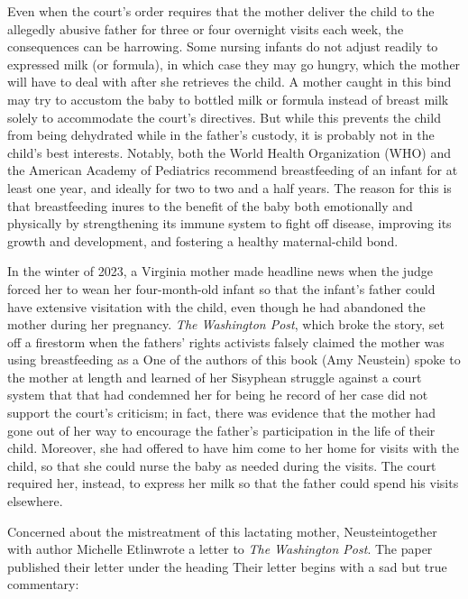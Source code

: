 Even when the court’s order requires  that the mother deliver
the child to the allegedly abusive father for three or four overnight visits
each week, the consequences can be harrowing. Some nursing infants do
not adjust readily to expressed milk (or formula), in which case they may
go hungry, which the mother will have to deal with after she retrieves
the child. A mother caught in this bind may try to accustom the baby
to bottled milk or formula instead of breast milk solely to accommodate
the court’s directives. But while this prevents the child from being 
dehydrated while in the father's custody, it is probably not in the child's best
interests. Notably, both the World Health Organization (WHO) and the
American Academy of Pediatrics recommend breastfeeding of an infant
for at least one year, and ideally for two to two and a half years. 
The reason for this is that breastfeeding inures to the benefit of the baby both emotionally and physically
by strengthening its immune system to fight off disease, improving its
growth and development, and fostering a healthy maternal-child bond. \pfl{}

In the winter of 2023, a Virginia mother made headline news when
the judge forced her to wean her four-month-old infant so that the infant's father could have extensive visitation with the child, even though
he had abandoned the mother during her pregnancy. \textit{The Washington
Post}, which broke the story, set off a firestorm when the fathers' 
rights activists falsely claimed the mother was using breastfeeding as a  One of the authors of this book (Amy Neustein)
spoke to the mother at length and learned of her Sisyphean struggle
against a court system that that had condemned her 
for being  he record of her case did not support the court's criticism;
in fact, there was evidence that the mother had gone out of her way to
encourage the father’s participation in the life of their child. Moreover,
she had offered to have him come to her home for visits with the child,
so that she could nurse the baby as needed during the visits. The court
required her, instead, to express her milk so that the father could spend
his visits elsewhere. \pfl{}


Concerned about the mistreatment of this lactating mother,
Neustein\mdash{}together with author Michelle Etlin\mdash{}wrote a letter to 
\textit{The Washington Post}. The paper published their letter under the heading
 Their letter
begins with a sad but true commentary: \hspace{1pt} \pfl{}


